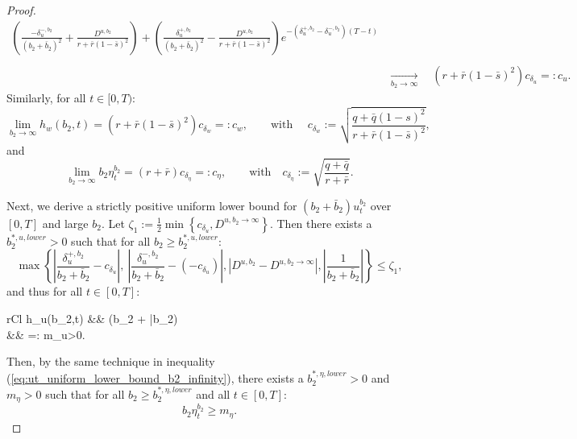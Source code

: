 \documentclass[11pt]{article}
\begin{document}
\begin{proof}
\begin{equation*}
\begin{split}
		{\displaystyle \left(\frac{- \delta^{-,b_2}_u}{(b_2 + \bar{b}_2)^2} + \frac{D^{u,b_2}}{r + \bar{r}(1-\bar{s})^2} \right) + \left(\frac{\delta^{+,b_2}_u}{(b_2 + \bar{b}_2)^2} - \frac{D^{u,b_2} }{r + \bar{r}(1-\bar{s})^2} \right)e^{- (\delta^{+,b_2}_u - \delta^{-,b_2}_u)(T-t)}  } \nonumber \\
		\\
		&\xrightarrow[b_2 \to \infty]{} \quad (r + \bar{r}(1-\bar{s})^2) c_{\delta_u}  =: c_u.
	\end{split}
	\end{equation*}
	Similarly, for all $t \in [0,T)$:
	$$\lim_{b_2 \to \infty} h_w(b_2,t)=  (r + \bar{r}(1-\bar{s})^2) c_{\delta_w} =: c_w,\qquad \text{with } \quad c_{\delta_w} := \sqrt{ \frac{q + \bar{q}(1-s)^2}{r + \bar{r}(1-\bar{s})^2} },$$
	and
	$$ \lim_{b_2 \to \infty}b_2 \eta_t^{b_2} = (r + \bar{r}) c_{\delta_{\eta}} =: c_\eta, \qquad \text{with} \quad c_{\delta_\eta} := \sqrt{ \frac{q + \bar{q}}{r +\bar{r}} }.$$
	
	Next, we derive a strictly positive uniform lower bound for $(b_2 + \bar{b}_2) u_t^{b_2}$ over $[0,T]$ and large $b_2$. Let $\zeta_1 :=\frac{1}{2} \min \left\{ c_{\delta_u}, D^{u,b_2 \to \infty} \right\}$. Then there exists a $b_2^{*,u,lower}>0$ such that for all $b_2 \geq b_2^{*,u,lower}$:
	$$ 
	\max \left\{  \left\vert \frac{\delta_u^{+,b_2}}{b_2 + \bar{b}_2}  - c_{\delta_u} \right\vert, \   \left\vert \frac{\delta_u^{-,b_2}}{b_2 + \bar{b}_2}  - \left(-c_{\delta_u}\right) \right\vert, \left\vert D^{u,b_2} - D^{u,b_2\to \infty} \right\vert,  \left\vert \frac{1}{b_2 + \bar{b}_2} \right\vert  \right\} \leq \zeta_1,
	$$ 
	and thus for all $t \in [0,T]$:
	\begin{IEEEeqnarray}{rCl}
		h_u(b_2,t) &\geq&  (b_2 + \bar{b}_2)  \nonumber \\
		&\geq&  =: m_u>0.
	\label{eq:ut_uniform_lower_bound_b2_infinity}
	\end{IEEEeqnarray}
	Then, by the same technique in inequality (\ref{eq:ut_uniform_lower_bound_b2_infinity}), there exists a $b_2^{*,\eta, lower} > 0$ and $m_\eta >0$ such that for all $b_2 \geq b_2^{*,\eta,lower}$ and all $t\in[0,T]$:
	\begin{equation}
	   b_2 \eta_t^{b_2} \geq m_\eta.
	\label{eq:eta_t_uniform_lower_bound_b2_infinity}
	\end{equation}


\end{proof}
\end{document}
